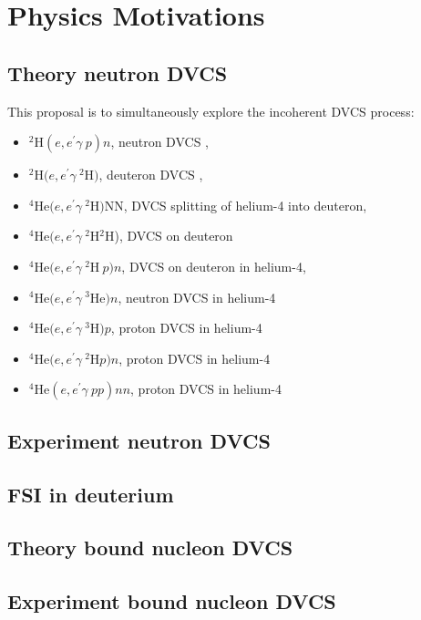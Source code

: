 
\chapter{Physics Motivations}
\label{chap:physics}

\section{Theory neutron DVCS}

This proposal is to simultaneously explore the incoherent DVCS process:
\begin{itemize}
   \item $^2$H$(e,e^{\prime}\gamma~p)n$,        neutron DVCS ,
   \item $^2$H$(e,e^{\prime}\gamma~^2$H$)$,     deuteron DVCS ,
   \item $^4$He$(e,e^{\prime}\gamma~^2$H$)$NN,  DVCS splitting of helium-4 into deuteron,
   \item $^4$He$(e,e^{\prime}\gamma~^2$H$^2$H), DVCS on deuteron
   \item $^4$He$(e,e^{\prime}\gamma~^2$H$~p)n$, DVCS on deuteron in helium-4,
   \item $^4$He$(e,e^{\prime}\gamma~^3$He$)n$,  neutron DVCS in  helium-4
   \item $^4$He$(e,e^{\prime}\gamma~^3$H$)p$,   proton DVCS in  helium-4
   \item $^4$He$(e,e^{\prime}\gamma~^2$H$p)n$,  proton DVCS in  helium-4
   \item $^4$He$(e,e^{\prime}\gamma~pp)nn$,     proton DVCS in  helium-4
\end{itemize}

\section{Experiment neutron DVCS}

\section{FSI in deuterium}

\section{Theory bound nucleon DVCS}

\section{Experiment bound nucleon DVCS}


